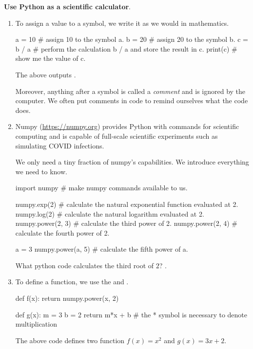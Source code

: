 \documentclass[../main.tex]{subfiles}
\begin{document}
\textbf{Use Python as a scientific calculator}.
\begin{enumerate}
  \item To assign a value to a symbol, we write it as we would in mathematics. 
    \begin{pythoncode}
a = 10     # assign 10 to the symbol a.
b = 20     # assign 20 to the symbol b.
c = b / a  # perform the calculation b / a and store the result in c.
print(c)   # show me the value of c.
    \end{pythoncode}
    \faComment{} The above outputs \underline{\hspace{3in}}.

    Moreover, anything after a \pythoninline{#} symbol is called a \emph{comment} and is ignored by the computer.  We often put comments in code to remind ourselves what the code does.

  \item Numpy (\url{https://numpy.org}) provides Python with commands for scientific computing and is capable of full-scale scientific experiments such as simulating COVID infections.

    We only need a tiny fraction of numpy's capabilities. We introduce everything we need to know.

    \begin{pythoncode}
import numpy     # make numpy commands available to us.

numpy.exp(2)     # calculate the natural exponential function evaluated at 2.
numpy.log(2)     # calculate the natural logarithm evaluated at 2.
numpy.power(2, 3)  # calculate the third power of 2.
numpy.power(2, 4)  # calculate the fourth power of 2.

a = 3
numpy.power(a, 5)  # calculate the fifth power of a.
    \end{pythoncode}

    \faComment{} What python code calculates the third root of \(2\)? \underline{\hspace{2in}}.

  \item To define a function, we use the  and .

    \begin{pythoncode}
def f(x):
    return numpy.power(x, 2)

def g(x):
    m = 3
    b = 2
    return m*x + b   # the * symbol is necessary to denote multiplication
    \end{pythoncode}
    The above code defines two function \(f(x) = x^{2}\) and \(g(x) = 3x + 2\).


\end{enumerate}
\end{document}
